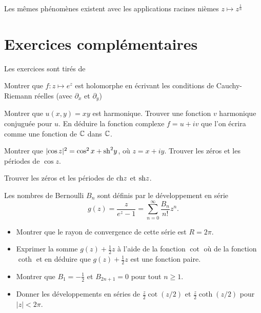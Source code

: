 \begin{rem}
Les mêmes phénomènes existent avec les applications racines nièmes $z \mapsto z^{\frac{1}{n}}$
\end{rem}



\section{Exercices complémentaires}
Les exercices sont tirés de \cite{gamelin2001complex,remmert1991theory}

\begin{exer}
Montrer que $f \colon z \mapsto e^z$ est holomorphe en écrivant les conditions de Cauchy-Riemann réelles (avec $\partial_x$ et $\partial_y$)
\end{exer}

\begin{exer}
Montrer que $u(x,y) = xy$ est harmonique. Trouver une fonction $v$ harmonique conjuguée pour $u$. En déduire la fonction complexe $f = u+iv$ que l'on écrira comme une fonction de $\mathbb{C}$ dans $\mathbb{C}$. 
\end{exer}

\begin{exer}
Montrer que $\lvert \cos z\rvert^2=\cos^2 x + \mathrm{sh}^2 y$, où $z=x+i y$. Trouver les zéros et les périodes de $\cos z$. 
\end{exer}

\begin{exer}
Trouver les zéros et les périodes de $\mathrm{ch} z$ et $\mathrm{sh} z$. 
\end{exer}


\begin{exer}
Les nombres de Bernoulli $B_n$ sont définis par le développement en série
\[g(z)=\frac{z}{e^z -1} = \sum_{n=0}^\infty \frac{B_n}{n!} z^n.\]
\begin{itemize}
\item Montrer que le rayon de convergence de cette série est $R=2 \pi$.
\item Exprimer la somme $g(z) + \frac{1}{2}z$ à l'aide de la fonction $\cot$ où de la fonction $\coth$ et en déduire que $g(z)+\frac{1}{2}z$ est une fonction paire.
\item Montrer que $B_1=-\frac{1}{2}$ et $B_{2n+1} =0$ pour tout $n\geq 1$.
\item Donner les développements en séries de $\frac{z}{2}\cot(z/2)$ et $\frac{z}{2}\coth(z/2)$ pour $\lvert z \rvert < 2 \pi$.
\end{itemize}
\end{exer}

